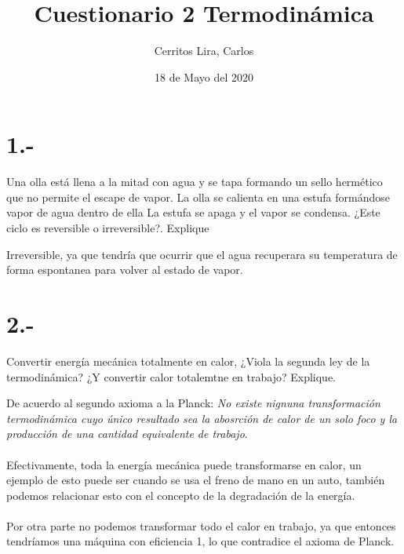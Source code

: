 \documentclass{article}
\title{Cuestionario 2 Termodinámica}
\author{Cerritos Lira, Carlos}
\date{18 de Mayo del 2020}
\begin{document}
\maketitle
\section*{1.-}
Una olla está llena a la mitad con agua y se tapa formando un sello
hermético que no permite el escape de vapor. La olla se calienta en una estufa 
formándose vapor de agua dentro de ella La estufa se apaga y el vapor se condensa. 
¿Este ciclo es reversible o irreversible?. Explique
\begin{tcolorbox}[breakable]
    Irreversible, ya que tendría que ocurrir que el agua recuperara su temperatura de forma 
    espontanea para volver al estado de vapor.
\end{tcolorbox}

\section*{2.-}
Convertir energía mecánica totalmente en calor, ¿Viola la segunda ley de la termodinámica?
¿Y convertir calor totalemtne en trabajo? Explique.
\begin{tcolorbox}[breakable]
    De acuerdo al segundo axioma a la Planck: \textit{No existe nignuna transformación termodinámica
    cuyo único resultado sea la abosrción de calor de un solo foco y la producción de una cantidad
    equivalente de trabajo}. \\ \\
    Efectivamente, toda la energía mecánica puede transformarse en calor, un ejemplo de esto puede ser cuando se 
    usa el freno de mano en un auto, también podemos relacionar esto con el concepto de la degradación de la energía. \\ \\
    Por otra parte no podemos transformar todo el calor en trabajo, ya que entonces tendríamos una 
    máquina con eficiencia 1, lo que contradice el axioma de Planck.
\end{tcolorbox}
\end{document}
